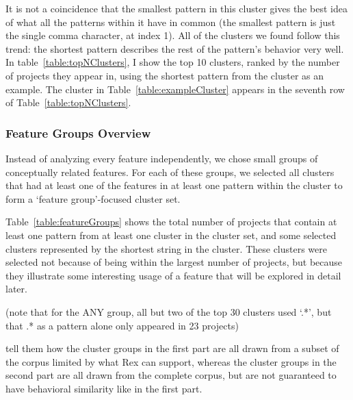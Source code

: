 It is not a coincidence that the smallest pattern in this cluster gives the best idea of what all the patterns within it have in common (the smallest pattern is just the single comma character, at index 1).  All of the clusters we found follow this trend: the shortest pattern describes the rest of the pattern's behavior very well.  In table~\ref{table:topNClusters}, I show the top 10 clusters, ranked by the number of projects they appear in, using the shortest pattern from the cluster as an example.
The cluster in Table~\ref{table:exampleCluster} appears in the seventh row of Table~\ref{table:topNClusters}.



\subsubsection{Feature Groups Overview}
Instead of analyzing every feature independently, we chose small groups of conceptually related features.  For each of these groups, we selected all clusters that had at least one of the features in at least one pattern within the cluster to form a `feature group'-focused cluster set.

Table~\ref{table:featureGroups} shows the total number of projects that contain at least one pattern from at least one cluster in the cluster set, and some selected clusters represented by the shortest string in the cluster.  These clusters were selected not because of being within the largest number of projects, but because they illustrate some interesting usage of a feature that will be explored in detail later.




(note that for the ANY group, all but two of the top 30 clusters used `.*', but that .* as a pattern alone only appeared in 23 projects)


tell them how the cluster groups in the first part are all drawn from a subset of the corpus limited by what Rex can support, whereas the cluster groups in the second part are all drawn from the complete corpus, but are not guaranteed to have behavioral similarity like in the first part.









